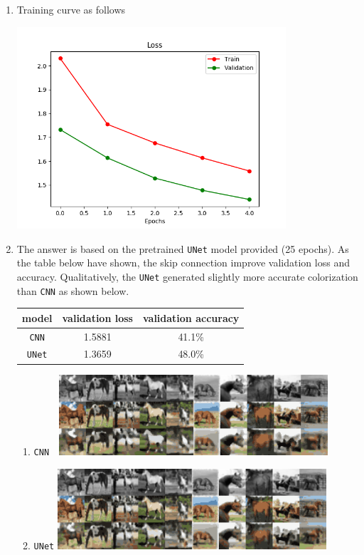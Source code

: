 \documentclass[11pt]{article}
\begin{document}
\begin{enumerate}
    \item Training curve as follows
    \begin{center}
        \includegraphics[width=10cm]{unet_training_curve.png}
    \end{center}
    \item The answer is based on the pretrained \texttt{UNet} model provided (25 epochs). As the table below have shown, the skip connection improve validation loss and accuracy. Qualitatively, the \texttt{UNet} generated slightly more accurate colorization than \texttt{CNN} as shown below.
    \begin{center}
        \begin{tabular}{c | c c}
            model & validation loss & validation accuracy \\
            \hline 
            \texttt{CNN} & 1.5881 & 41.1\%\\
            \texttt{UNet} & 1.3659 & 48.0\%\\
        \end{tabular}
    \end{center}
    \begin{enumerate}
        \item \texttt{CNN} \,\, \includegraphics[width=10cm]{eval_CNN.png}
        \item \texttt{UNet} \includegraphics[width=10cm]{eval_UNet.png} 

\end{enumerate}
\end{enumerate}
\end{document}
